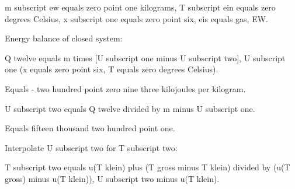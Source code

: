 m subscript ew equals zero point one kilograms, T subscript ein equals zero degrees Celsius, x subscript one equals zero point six, eis equals gas, EW.

Energy balance of closed system:

Q twelve equals m times [U subscript one minus U subscript two], U subscript one (x equals zero point six, T equals zero degrees Celsius).

Equals - two hundred point zero nine three kilojoules per kilogram.

U subscript two equals Q twelve divided by m minus U subscript one.

Equals fifteen thousand two hundred point one.

Interpolate U subscript two for T subscript two:

T subscript two equals u(T klein) plus (T gross minus T klein) divided by (u(T gross) minus u(T klein)), U subscript two minus u(T klein).
